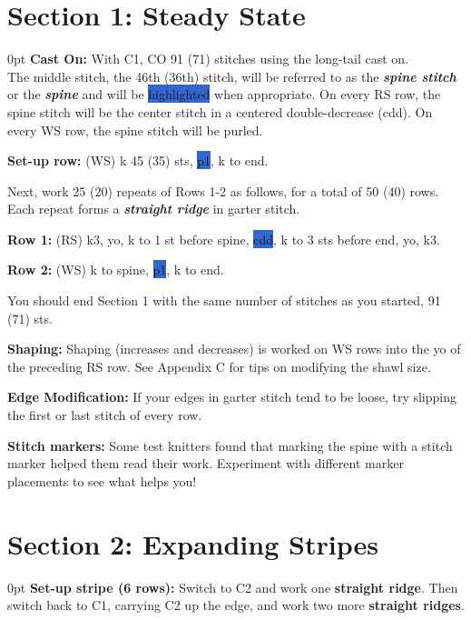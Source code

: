 \documentclass[12pt]{article}
\newcommand{\vocab}[1]{\emph{\textbf{#1}}} %
\newcommand{\rowDir}[1]{\hspace{-2em} \textbf{#1:}} %
\newcommand{\spine}[1]{\colorbox{highlight}{#1}} %
\newenvironment{frnote}
    {%
    	\setlength{\FrameRule}{1.5pt}
    	\def\FrameCommand{\fboxrule=\FrameRule\fboxsep=\FrameSep \fcolorbox{framecolor}{shadecolor}}
    	\MakeFramed {\FrameRestore}}
    {\setlength{\FrameRule}{1pt}
	\endMakeFramed}
\newenvironment{frdirection}
    {%
	\def\FrameCommand{\fboxrule=\FrameRule\fboxsep=\FrameSep \fbox}
   	\MakeFramed {\advance\hsize-\width \FrameRestore}
    	\addmargin[1.5cm]{0pt}}
    {\endaddmargin
	\endMakeFramed}
\newenvironment{unframed}
    {%
	\begin{addmargin}[1.5cm]{0pt}}
    {\vspace{1em}
	\end{addmargin}}
\begin{document}
\newpage
\section*{Section 1: Steady State}

\begin{unframed}
\rowDir{Cast On} With C1, CO 91 (71) stitches using the long-tail cast on. \\ The middle stitch, the 46th (36th) stitch, will be referred to as the \vocab{spine stitch} or the \vocab{spine} and will be \spine{highlighted} when appropriate. On every RS row, the spine stitch will be the center stitch in a centered double-decrease (cdd). On every WS row, the spine stitch will be purled.
 
\rowDir{Set-up row} (WS) k 45 (35) sts, \spine{p1}, k to end. 
\end{unframed}

Next, work 25 (20) repeats of Rows 1-2 as follows, for a total of 50 (40) rows. Each repeat forms a \vocab{straight ridge} in garter stitch.

\begin{frdirection}
\rowDir{Row 1} (RS) k3, yo, k to 1 st before spine, \spine{cdd},  k to 3 sts before end, yo, k3.

\rowDir{Row 2} (WS) k to spine, \spine{p1}, k to end.
\end{frdirection}

You should end Section 1 with the same number of stitches as you started, 91 (71) sts.

\begin{frnote}
\textbf{Shaping:}  Shaping (increases and decreases) is worked on WS rows into the yo of the preceding RS row. See Appendix C for tips on modifying the shawl size.

\textbf{Edge Modification:} If your edges in garter stitch tend to be loose, try slipping the first or last stitch of every row.

\textbf{Stitch markers:} Some test knitters found that marking the spine with a stitch marker helped them read their work. Experiment with different marker placements to see what helps you!
\end{frnote}

\section*{Section 2: Expanding Stripes}
\begin{unframed}
\rowDir{Set-up stripe (6 rows)} Switch to C2 and work one \textbf{straight ridge}. Then switch back to C1, carrying C2 up the edge, and work two more \textbf{straight ridges}. 
\end{unframed}
\end{document}
